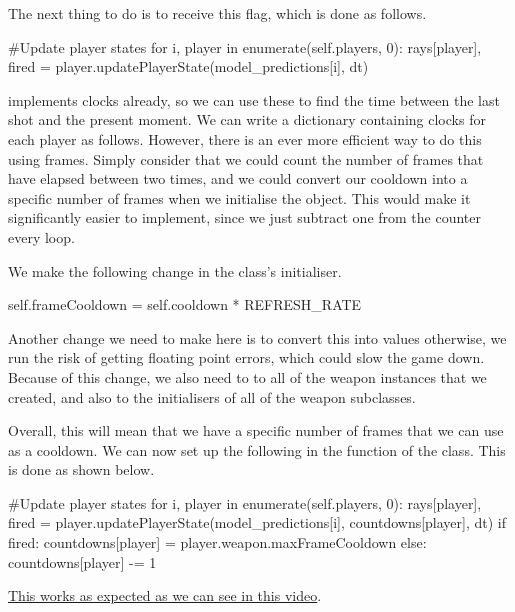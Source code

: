 \vs
The next thing to do is to receive this  flag, which is done as follows.

\begin{mpy}
            #Update player states
            for i, player in enumerate(self.players, 0):
                rays[player], fired = player.updatePlayerState(model_predictions[i], dt)
\end{mpy}

\vs
{} implements clocks already, so we can use these to find the time between the last shot and the present moment. We can write a dictionary containing clocks for each player as follows. However, there is an ever more efficient way to do this using frames. Simply consider that we could count the number of frames that have elapsed between two times, and we could convert our cooldown into a specific number of frames when we initialise the object. This would make it significantly easier to implement, since we just subtract one from the counter every loop.
\vs

We make the following change in the  class's initialiser.

\begin{mpy}
    self.frameCooldown = self.cooldown * REFRESH_RATE
\end{mpy}

Another change we need to make here is to convert this into  values otherwise, we run the risk of getting floating point errors, which could slow the game down. Because of this change, we also need to  to all of the weapon instances that we created, and also to the initialisers of all of the weapon subclasses.

\vs
Overall, this will mean that we have a specific number of frames that we can use as a cooldown. We can now set up the following in the  function of the  class. This is done as shown below.

\begin{mpy}
            #Update player states
            for i, player in enumerate(self.players, 0):
                rays[player], fired = player.updatePlayerState(model_predictions[i], countdowns[player], dt)
                if fired:
                    countdowns[player] = player.weapon.maxFrameCooldown
                else:
                    countdowns[player] -= 1
\end{mpy}

\href{https://youtu.be/Bd2_x8gDJYE}{This works as expected as we can see in this video}. 

